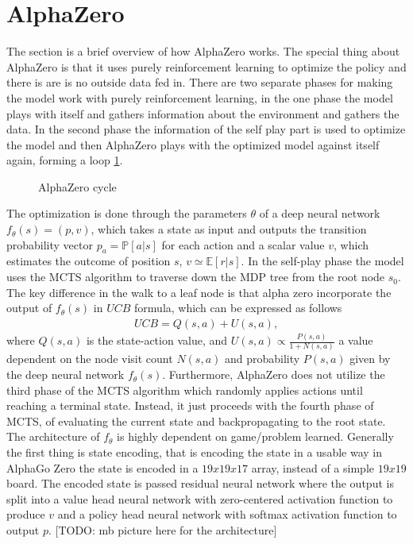 \section{AlphaZero}
The section is a brief overview of how AlphaZero \cite{alphazero} works. The
special thing about AlphaZero is that it uses purely reinforcement learning
to optimize the policy and there is are is no outside data fed in. There are
two separate phases for making the model work with purely
reinforcement learning, in the one phase the model plays with itself and
gathers information about the environment and gathers the data. In the second
phase the information of the self play part is used to optimize the model and
then AlphaZero plays with the optimized model against itself again, forming a
loop \ref{fig: 5}.
\begin{figure}[htb!]
    \centering
    \caption{AlphaZero cycle \label{fig: 5}}
\end{figure}
The optimization is done through the parameters $\theta$ of a deep neural
network $f_\theta(s) = (p, v)$, which takes a state as input and outputs the
transition probability vector $p_a = \mathbb{P}[a|s]$ for each action and a
scalar value $v$, which estimates the outcome of position $s$, $v \simeq
\mathbb{E}[r|s]$.
In the self-play phase the model uses the MCTS algorithm to traverse down the
MDP tree from the root node $s_0$. The key difference in the walk to a leaf
node is that alpha zero incorporate the output of $f_\theta(s)$ in $UCB$
formula, which can be expressed as follows
\begin{align}
    UCB = Q(s,a) + U(s,a),
\end{align}
where $Q(s,a)$ is the state-action value, and $U(s,a)\propto
\frac{P(s,a)}{1+N(s,a)}$ a value dependent on the node visit count $N(s, a)$
and probability $P(s, a)$ given by the deep neural network $f_\theta(s)$.
Furthermore, AlphaZero does not utilize the third phase of the MCTS algorithm
which randomly applies actions until reaching a terminal state. Instead, it
just proceeds with the fourth phase of MCTS, of evaluating the current state
and backpropagating to the root state. The architecture of $f_\theta$ is
highly dependent on game/problem learned. Generally the first thing is state
encoding, that is encoding the state in a usable way in AlphaGo
Zero\cite{alphazero} the state is encoded in a $19x19x17$ array, instead of a
simple $19x19$ board. The encoded state is passed residual neural network
where the output is split into a value head neural network with zero-centered
activation function to produce $v$ and a policy head neural network with
softmax activation function to output $p$.
[TODO: mb picture here for the architecture]

